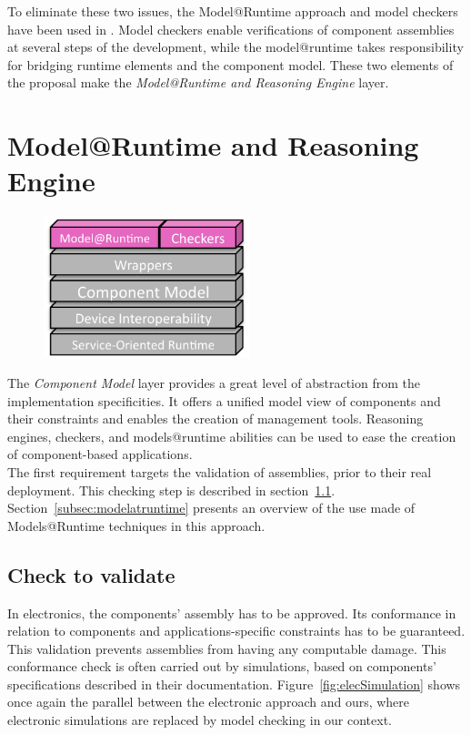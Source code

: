 To eliminate these two issues, the Model@Runtime approach and model checkers have been used in \enti{}. Model checkers enable verifications of component assemblies at several steps of the development, while the model@runtime takes responsibility for bridging runtime elements and the component model. These two elements of the proposal make the {\it Model@Runtime and Reasoning Engine} layer.\\


\section{Model@Runtime and Reasoning Engine}

\begin{figure}
  \vspace{-5mm}
  \includegraphics[width=60mm]{part2/pics/layers/MartReasoners.pdf}
  \vspace{-5mm}
\end{figure}

The {\it Component Model} layer provides a great level of abstraction from the implementation specificities. It offers a unified model view of components and their constraints and enables the creation of management tools. Reasoning engines, checkers, and models@runtime abilities can be used to ease the creation of component-based applications.\\
The first requirement targets the validation of assemblies, prior to their real deployment. This checking step is described in section~\ref{subsec:check_to_validate}. Section~\ref{subsec:modelatruntime} presents an overview of the use made of Models@Runtime techniques in this approach.


\subsection{Check to validate}
\label{subsec:check_to_validate}

In electronics, the components' assembly has to be approved. Its conformance in relation to components and applications-specific constraints has to be guaranteed. This validation prevents assemblies from having any computable damage. This conformance check is often carried out by simulations, based on components' specifications described in their documentation. Figure~\ref{fig:elecSimulation} shows once again the parallel between the electronic approach and ours, where electronic simulations are replaced by model checking in our context.\\

